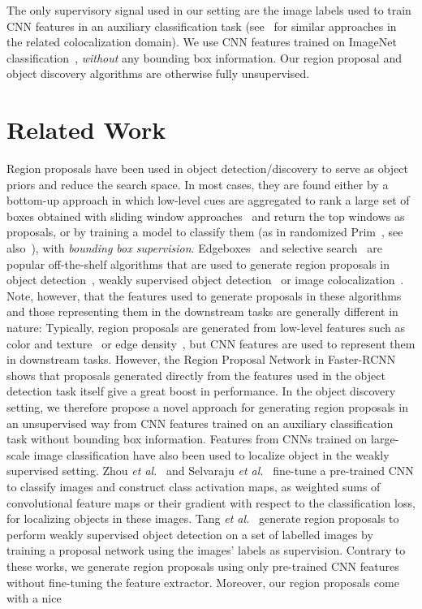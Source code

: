 \documentclass[runningheads]{llncs}
\begin{document}
The only supervisory signal used in our setting are the image labels used to train CNN features in an auxiliary classification task (see~\cite{Li2016mimick,Wei2019ddtplus} for similar approaches in the related colocalization domain). We use CNN features trained on ImageNet classification~\cite{Symonian2014verydeep}, {\em without} any bounding box information. Our region proposal and object discovery algorithms are otherwise fully unsupervised.


\section{Related Work}
\label{sec:related_work}
Region proposals have been used in object detection/discovery to serve as object priors and reduce the search space. In most cases, they are found either by a bottom-up approach in which low-level cues are aggregated to rank a large set of boxes obtained with sliding window approaches~\cite{alexe2012measuring,uijlings2013selective,zitnick2014edge} and return the top windows as proposals, or by training a model to classify them (as in randomized Prim~\cite{Manen2013prim}, see also~\cite{ren15fasterrcnn}), with \textit{ bounding box supervision}. Edgeboxes~\cite{zitnick2014edge} and selective search~\cite{uijlings2013selective} are popular off-the-shelf algorithms that are used to generate region proposals in object detection~\cite{girshickICCV15fastrcnn,girshick2014rcnn}, weakly supervised object detection~\cite{Cinbis2015weakly,Tang2018TPAMI_pcl_wosd} or image colocalization~\cite{Li2016mimick}. Note, however, that the features used to generate proposals in these algorithms and those representing them in the downstream tasks are generally different in nature: Typically, region proposals are generated from low-level features such as color and texture~\cite{uijlings2013selective} or edge density~\cite{zitnick2014edge}, but CNN features are used to represent them in downstream tasks. However, the Region Proposal Network in Faster-RCNN~\cite{ren15fasterrcnn} shows that proposals generated directly from the features used in the object detection task itself give a great boost in performance. In the object discovery setting, we therefore propose a novel approach for generating region proposals in an unsupervised way from CNN features trained on an auxiliary classification task without bounding box information. Features from CNNs trained on large-scale image classification have also been used to localize object in the weakly supervised setting. Zhou {\em et al.}~\cite{Zhou2016cvpr} and Selvaraju {\em et al.}~\cite{Selvaraju2017ICCV} fine-tune a pre-trained CNN to classify images and construct class activation maps, as weighted sums of convolutional feature maps or their gradient with respect to the classification loss, for localizing objects in these images. Tang {\em et al.}~\cite{Tang2018weakRPN} generate region proposals to perform weakly supervised object detection on a set of labelled images by training a proposal network using the images' labels as supervision. Contrary to these works, we generate region proposals using only pre-trained CNN features without fine-tuning the feature extractor. Moreover, our region proposals come with a nice 
\end{document}
